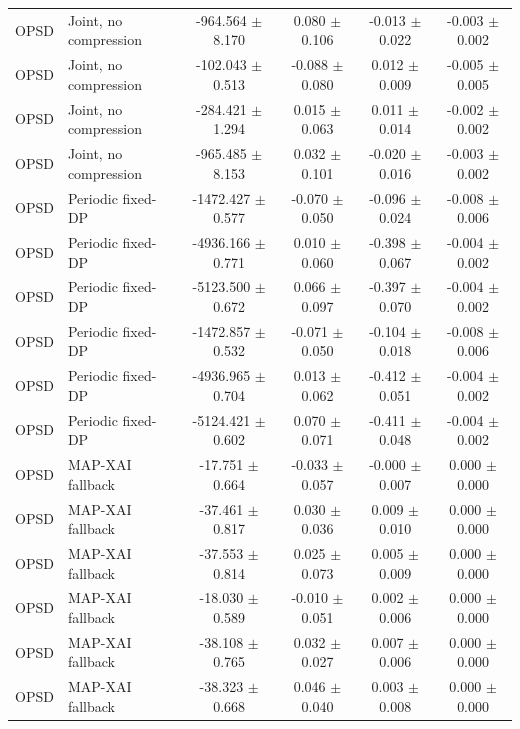 \begin{table}[t]
\begin{tabular}{llcccc}
OPSD & Joint, no compression & -964.564 $\pm$ 8.170 & 0.080 $\pm$ 0.106 & -0.013 $\pm$ 0.022 & -0.003 $\pm$ 0.002 \\
OPSD & Joint, no compression & -102.043 $\pm$ 0.513 & -0.088 $\pm$ 0.080 & 0.012 $\pm$ 0.009 & -0.005 $\pm$ 0.005 \\
OPSD & Joint, no compression & -284.421 $\pm$ 1.294 & 0.015 $\pm$ 0.063 & 0.011 $\pm$ 0.014 & -0.002 $\pm$ 0.002 \\
OPSD & Joint, no compression & -965.485 $\pm$ 8.153 & 0.032 $\pm$ 0.101 & -0.020 $\pm$ 0.016 & -0.003 $\pm$ 0.002 \\
OPSD & Periodic fixed-DP & -1472.427 $\pm$ 0.577 & -0.070 $\pm$ 0.050 & -0.096 $\pm$ 0.024 & -0.008 $\pm$ 0.006 \\
OPSD & Periodic fixed-DP & -4936.166 $\pm$ 0.771 & 0.010 $\pm$ 0.060 & -0.398 $\pm$ 0.067 & -0.004 $\pm$ 0.002 \\
OPSD & Periodic fixed-DP & -5123.500 $\pm$ 0.672 & 0.066 $\pm$ 0.097 & -0.397 $\pm$ 0.070 & -0.004 $\pm$ 0.002 \\
OPSD & Periodic fixed-DP & -1472.857 $\pm$ 0.532 & -0.071 $\pm$ 0.050 & -0.104 $\pm$ 0.018 & -0.008 $\pm$ 0.006 \\
OPSD & Periodic fixed-DP & -4936.965 $\pm$ 0.704 & 0.013 $\pm$ 0.062 & -0.412 $\pm$ 0.051 & -0.004 $\pm$ 0.002 \\
OPSD & Periodic fixed-DP & -5124.421 $\pm$ 0.602 & 0.070 $\pm$ 0.071 & -0.411 $\pm$ 0.048 & -0.004 $\pm$ 0.002 \\
OPSD & MAP-XAI fallback & -17.751 $\pm$ 0.664 & -0.033 $\pm$ 0.057 & -0.000 $\pm$ 0.007 & 0.000 $\pm$ 0.000 \\
OPSD & MAP-XAI fallback & -37.461 $\pm$ 0.817 & 0.030 $\pm$ 0.036 & 0.009 $\pm$ 0.010 & 0.000 $\pm$ 0.000 \\
OPSD & MAP-XAI fallback & -37.553 $\pm$ 0.814 & 0.025 $\pm$ 0.073 & 0.005 $\pm$ 0.009 & 0.000 $\pm$ 0.000 \\
OPSD & MAP-XAI fallback & -18.030 $\pm$ 0.589 & -0.010 $\pm$ 0.051 & 0.002 $\pm$ 0.006 & 0.000 $\pm$ 0.000 \\
OPSD & MAP-XAI fallback & -38.108 $\pm$ 0.765 & 0.032 $\pm$ 0.027 & 0.007 $\pm$ 0.006 & 0.000 $\pm$ 0.000 \\
OPSD & MAP-XAI fallback & -38.323 $\pm$ 0.668 & 0.046 $\pm$ 0.040 & 0.003 $\pm$ 0.008 & 0.000 $\pm$ 0.000 \\
\bottomrule
\end{tabular}
\end{table}
